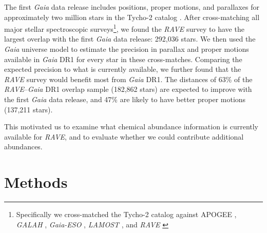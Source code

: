 \documentclass[preprint2,trackchanges]{aastex}
\newcommand{\project}[1]{\textsl{#1}}
\begin{document}
The first \project{Gaia} data release includes positions, proper motions, and parallaxes for approximately two million stars in the Tycho-2 catalog \citep{tycho2}.  After cross-matching all major stellar spectroscopic surveys\footnote{Specifically we cross-matched the Tycho-2 catalog against {APOGEE} \citep{apogee}, \project{GALAH} \citep{galah}, \project{Gaia-ESO} \citep{ges}, \project{LAMOST} \citep{lamost}, and \project{RAVE} \citep{rave}}, we found the \project{RAVE} survey to have the largest overlap with the first \project{Gaia} data release: 292,036 stars.  We then used the \project{Gaia} universe model to estimate the precision in parallax and proper motions available in \project{Gaia} DR1 for every star in these cross-matches.  Comparing the expected precision to what is currently available, we further found that the \project{RAVE} survey would benefit most from \project{Gaia} DR1.  The distances of 63\% of the \project{RAVE}--\project{Gaia} DR1 overlap sample (182,862 stars) are expected to improve with the first \project{Gaia} data release, and 47\% are likely to have better proper motions (137,211 stars).


This motivated us to examine what chemical abundance information is currently available for \project{RAVE}, and to evaluate whether we could contribute additional abundances.








\section{Methods}
\label{sec:methods}


\end{document}
